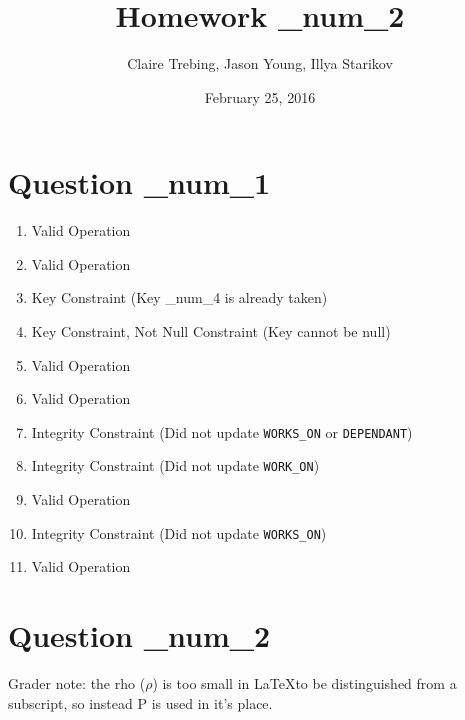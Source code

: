 \documentclass{article}
\title{Homework \_num_2}
\author{Claire Trebing, Jason Young, Illya Starikov}
\date{February 25, 2016}
\newcommand{\Rho}{\mathrm{P}}
\begin{document}
\maketitle

\section*{Question \_num_1}
\begin{enumerate}[label=\alph*.]
    \item Valid Operation
    \item Valid Operation
    \item Key Constraint (Key \_num_4 is already taken)
    \item Key Constraint, Not Null Constraint (Key cannot be null)
    \item Valid Operation
    \item Valid Operation
    \item Integrity Constraint (Did not update \texttt{WORKS\_ON} or \texttt{DEPENDANT})
    \item Integrity Constraint (Did not update
    \texttt{WORK\_ON})
    \item Valid Operation
    \item Integrity Constraint (Did not update \texttt{WORKS\_ON})
    \item Valid Operation
\end{enumerate}

\section*{Question \_num_2}
Grader note: the rho ($\rho$) is too small in \LaTeX to be distinguished from a subscript, so instead $\Rho$ is used in it's place.
\end{document}
